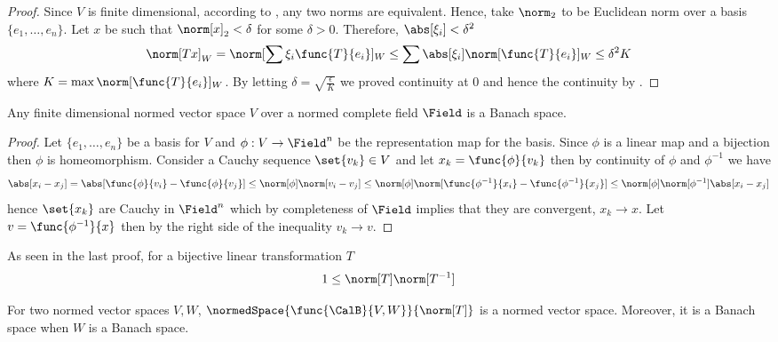 \begin{proof}
    Since \(V\) is finite dimensional, according to , any two norms are equivalent. Hence, take \(\norm_2\) to be Euclidean norm over a basis \(\{e_1, \dots , e_n\}\). Let \(x\) be such that \(\norm[x]_2 < \delta\) for some \(\delta > 0\). Therefore, \(\abs[\xi_i] < \delta^2\)
    \begin{equation*}
        \norm[Tx]_W = \norm[\sum \xi_i \func{T}{e_i}]_W \leq \sum \abs[\xi_i] \norm[\func{T}{e_i}]_W \leq \delta^2 K
    \end{equation*}
    where \(K = \max \norm[\func{T}{e_i}]_W \). By letting \(\delta = \sqrt{\frac{\epsilon}{K}}\) we proved continuity at \(0\) and hence the continuity by .
\end{proof}

\begin{corollary}
    Any finite dimensional normed vector space \(V\) over a normed complete field \(\Field\) is a Banach space.
\end{corollary}

\begin{proof}
    Let \(\{e_1, \dots , e_n\}\) be a basis for \(V\) and \(\phi : V \to \Field^n\) be the representation map for the basis. Since \(\phi\) is a linear map and a bijection then \(\phi\) is homeomorphism. Consider a Cauchy sequence \(\set{v_k} \in V\) and let \(x_k = \func{\phi}{v_k}\) then by continuity of \(\phi\) and \(\phi^{-1}\) we have
    \begin{equation*}
        \abs[x_i - x_j] = \abs[\func{\phi}{v_i} - \func{\phi}{v_j}] \leq \norm[\phi] \norm[v_i - v_j] \leq \norm[\phi] \norm[\func{\phi^{-1}}{x_i} - \func{\phi^{-1}}{x_j}] \leq \norm[\phi] \norm[\phi^{-1}] \abs[x_i - x_j]
    \end{equation*}
    hence \(\set{x_k}\) are Cauchy in \(\Field^n\) which by completeness of \(\Field\) implies that they are convergent, \(x_k \to x\). Let \(v = \func{\phi^{-1}}{x}\) then by the right side of the inequality \(v_k \to v\).
\end{proof}

\begin{remark}
    As seen in the last proof, for a bijective linear transformation \(T\)
    \begin{equation*}
        1 \leq \norm[T] \norm[T^{-1}]
    \end{equation*}
\end{remark}

\begin{theorem}
    For two normed vector spaces \(V,W\), \(\normedSpace{\func{\CalB}{V,W}}{\norm[T]}\) is a normed vector space. Moreover, it is a Banach space when \(W\) is a Banach space.
\end{theorem}


